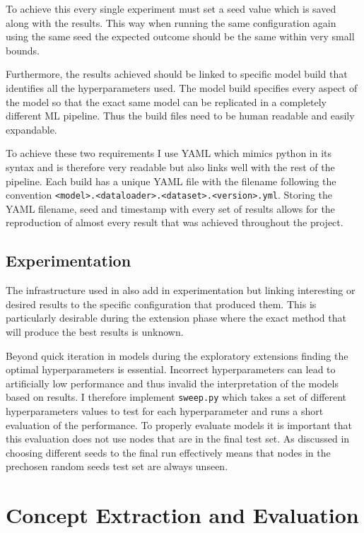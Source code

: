 To achieve this every single experiment must set a seed value which is saved along with the results.
This way when running the same configuration again using the same seed the expected outcome should be the same within very small bounds.

Furthermore, the results achieved should be linked to specific model build that identifies all the hyperparameters used.
The model build specifies every aspect of the model so that the exact same model can be replicated in a completely different ML pipeline.
Thus the build files need to be human readable and easily expandable.

To achieve these two requirements I use YAML which mimics python in its syntax and is therefore very readable but also links well with the rest of the pipeline.
Each build has a unique YAML file with the filename following the convention \texttt{<model>.<dataloader>.<dataset>.<version>.yml}.
Storing the YAML filename, seed and timestamp with every set of results allows for the reproduction of almost every result that was achieved throughout the project.

\subsection{Experimentation}
The infrastructure used in  also add in experimentation but linking interesting or desired results to the specific configuration that produced them.
This is particularly desirable during the extension phase where the exact method that will produce the best results is unknown.

Beyond quick iteration in models during the exploratory extensions finding the optimal hyperparameters is essential.
Incorrect hyperparameters can lead to artificially low performance and thus invalid the interpretation of the models based on results.
I therefore implement \texttt{sweep.py} which takes a set of different hyperparameters values to test for each hyperparameter and runs a short evaluation of the performance.
To properly evaluate models it is important that this evaluation does not use nodes that are in the final test set.
As discussed in  choosing different seeds to the final run effectively means that nodes in the prechosen random seeds test set are always unseen.

\section{Concept Extraction and Evaluation}
\label{sec:concepts}

